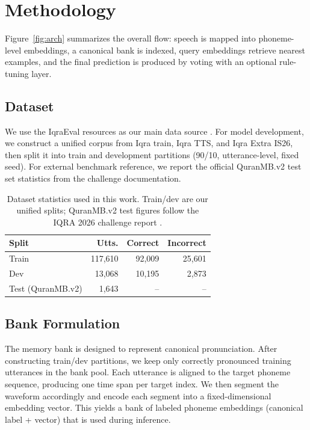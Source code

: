\documentclass[11pt]{article}
\begin{document}
\section{Methodology}
Figure~\ref{fig:arch} summarizes the overall flow: speech is mapped into phoneme-level embeddings, a canonical bank is indexed, query embeddings retrieve nearest examples, and the final prediction is produced by voting with an optional rule-tuning layer.


\subsection{Dataset}
We use the IqraEval resources as our main data source \citep{el-kheir-etal-2025-iqraeval,el-kheir-etal-2026-iqra-interspeech}. For model development, we construct a unified corpus from Iqra train, Iqra TTS, and Iqra Extra IS26, then split it into train and development partitions (90/10, utterance-level, fixed seed). For external benchmark reference, we report the official QuranMB.v2 test set statistics from the challenge documentation.

\begin{table}[t]
  \centering
  \small
  \setlength{\tabcolsep}{4pt}
  \begin{tabular}{lrrr}
    \hline
    Split & Utts. & Correct & Incorrect \\
    \hline
    Train & 117{,}610 & 92{,}009 & 25{,}601 \\
    Dev & 13{,}068 & 10{,}195 & 2{,}873 \\
    Test (QuranMB.v2) & 1{,}643 & -- & -- \\
    \hline
  \end{tabular}
  \caption{Dataset statistics used in this work. Train/dev are our unified splits; QuranMB.v2 test figures follow the IQRA 2026 challenge report \citep{el-kheir-etal-2026-iqra-interspeech}.}
  \label{tab:dataset-stats}
\end{table}

\subsection{Bank Formulation}
The memory bank is designed to represent canonical pronunciation. After constructing train/dev partitions, we keep only correctly pronounced training utterances in the bank pool. Each utterance is aligned to the target phoneme sequence, producing one time span per target index. We then segment the waveform accordingly and encode each segment into a fixed-dimensional embedding vector. This yields a bank of labeled phoneme embeddings (canonical label + vector) that is used during inference.
\end{document}
